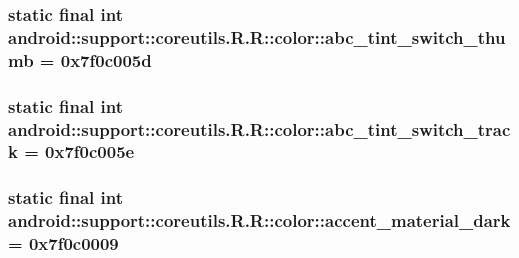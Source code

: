 \hypertarget{classandroid_1_1support_1_1coreutils_1_1_r_1_1color_b768a8d4be276013bc08431ca637c435}{
\subsubsection[{abc\_\-tint\_\-switch\_\-thumb}]{\setlength{\rightskip}{0pt plus 5cm}static final int android::support::coreutils.R.R::color::abc\_\-tint\_\-switch\_\-thumb = 0x7f0c005d}}
\label{classandroid_1_1support_1_1coreutils_1_1_r_1_1color_b768a8d4be276013bc08431ca637c435}


\hypertarget{classandroid_1_1support_1_1coreutils_1_1_r_1_1color_f673db1481ff8c808a50b87ed269ba7f}{
\subsubsection[{abc\_\-tint\_\-switch\_\-track}]{\setlength{\rightskip}{0pt plus 5cm}static final int android::support::coreutils.R.R::color::abc\_\-tint\_\-switch\_\-track = 0x7f0c005e}}
\label{classandroid_1_1support_1_1coreutils_1_1_r_1_1color_f673db1481ff8c808a50b87ed269ba7f}


\hypertarget{classandroid_1_1support_1_1coreutils_1_1_r_1_1color_28a9e6c37fb19f6ad56adce95ff0a273}{
\subsubsection[{accent\_\-material\_\-dark}]{\setlength{\rightskip}{0pt plus 5cm}static final int android::support::coreutils.R.R::color::accent\_\-material\_\-dark = 0x7f0c0009}}
\label{classandroid_1_1support_1_1coreutils_1_1_r_1_1color_28a9e6c37fb19f6ad56adce95ff0a273}


